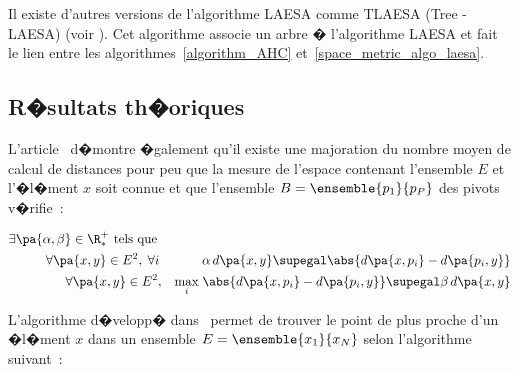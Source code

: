 
Il existe d'autres versions de l'algorithme LAESA comme TLAESA (Tree - LAESA) (voir ). Cet algorithme associe un arbre � l'algorithme LAESA et fait le lien entre les algorithmes~\ref{algorithm_AHC} et~\ref{space_metric_algo_laesa}.




\subsection{R�sultats th�oriques}

L'article~ d�montre �galement qu'il existe une majoration du nombre moyen de calcul de distances pour peu que la mesure de l'espace contenant l'ensemble $E$ et l'�l�ment $x$ soit connue et que l'ensemble $B = \ensemble{p_1}{p_P}$ des pivots v�rifie~:

            \begin{eqnarray}
            \exists \pa{\alpha,\beta} \in \R^+_* \text{ tels que } && \nonumber\\
            \forall \pa{x,y} \in E^2, \; \forall i\, && \alpha \, d\pa{x,y} \supegal 
                            \abs{d\pa{x,p_i} - d\pa{p_i,y}} \label{space_metric_cond_1} \\
            \forall \pa{x,y} \in E^2, && \underset{i}{\max} \; \abs{d\pa{x,p_i} - d\pa{p_i,y}} \supegal 
                            \beta \, d\pa{x,y} \label{space_metric_cond_1}
            \end{eqnarray}


L'algorithme d�velopp� dans~ permet de trouver le point de plus proche d'un �l�ment $x$ dans un ensemble $E = \ensemble{x_1}{x_N}$ selon l'algorithme suivant~:


